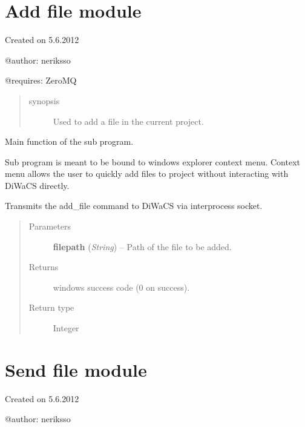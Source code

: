 \documentclass[letterpaper,10pt,english]{sphinxmanual}
\begin{document}
\section{Add file module}
\label{api:add-file-module}\label{api:module-add_file}
Created on 5.6.2012

@author: neriksso

@requires: ZeroMQ
\begin{quote}\begin{description}
\item[{synopsis}] \leavevmode
Used to add a file in the current project.

\end{description}\end{quote}

\begin{fulllineitems}
\label{api:add_file.main}
Main function of the sub program.

Sub program is meant to be bound to windows explorer context menu.
Context menu allows the user to quickly add files to project without interacting with DiWaCS directly.

Transmits the add\_file command to DiWaCS via interprocess socket.
\begin{quote}\begin{description}
\item[{Parameters}] \leavevmode
\textbf{filepath} (\emph{String}) -- Path of the file to be added.

\item[{Returns}] \leavevmode
windows success code (0 on success).

\item[{Return type}] \leavevmode
Integer

\end{description}\end{quote}

\end{fulllineitems}



\section{Send file module}
\label{api:module-send_file_to}\label{api:send-file-module}
Created on 5.6.2012

@author: neriksso
\end{document}
